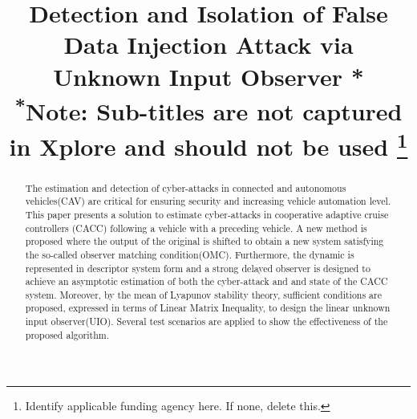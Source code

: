 \documentclass[conference]{IEEEtran}
\begin{document}
\title{Detection and Isolation of False Data Injection Attack via Unknown Input Observer *\\
{\footnotesize \textsuperscript{*}Note: Sub-titles are not captured in Xplore and
should not be used}
\thanks{Identify applicable funding agency here. If none, delete this.}
}

\author{
\and
{}
\and
{}
}

\maketitle

\begin{abstract}
The estimation and detection of cyber-attacks in connected and autonomous vehicles(CAV) are critical for ensuring security and increasing vehicle automation level. This paper presents a solution to estimate cyber-attacks in cooperative adaptive cruise controllers (CACC) following a vehicle with a preceding vehicle. A new method is proposed where the output of the original is shifted to obtain a new system satisfying the so-called observer matching condition(OMC). Furthermore, the dynamic is represented in descriptor system form and a strong delayed observer is designed to achieve an asymptotic estimation of both the cyber-attack and and state of the CACC system. Moreover, by the mean of Lyapunov stability theory, sufficient conditions are proposed, expressed in terms of Linear Matrix Inequality, to design the linear unknown input observer(UIO). Several test scenarios are applied to show the effectiveness of the proposed algorithm.
\end{abstract}
\end{document}
